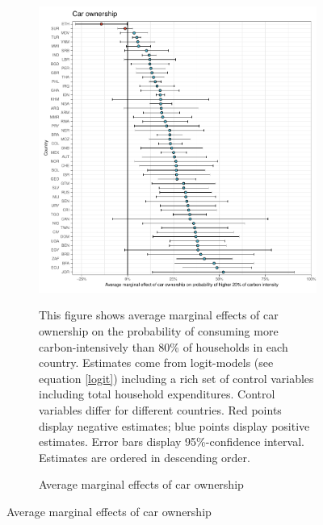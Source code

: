  \begin{figure}[ht!]\ContinuedFloat
   \centering
   \begin{subfigure}[b]{\textwidth}
   \centering
   \caption{Average marginal effects of car ownership} \label{fig:Logit_ME_car}
   \includegraphics{1_Figures/Analysis_Logit_Models_Marginal_Effects/Average_Marginal_Effects_affected_upper_80_car.01_2017B.pdf}
   \begin{subcaption2}
     This figure shows average marginal effects of car ownership on the probability of consuming more carbon-intensively than 80\% of households in each country. Estimates come from logit-models (see equation \ref{logit}) including a rich set of control variables including total household expenditures. Control variables differ for different countries. Red points display negative estimates; blue points display positive estimates. Error bars display 95\%-confidence interval. Estimates are ordered in descending order.
   \end{subcaption2}
   \end{subfigure}
 \end{figure}
 \clearpage

